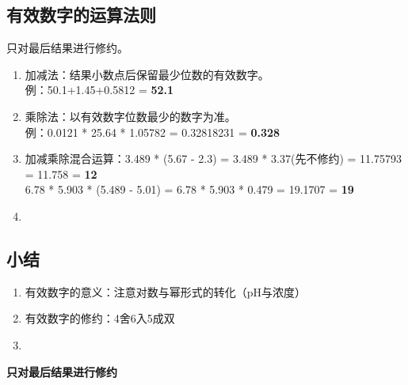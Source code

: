 \documentclass[12pt, a4paper, oneside]{ctexbook}
\begin{document}
\subsection*{有效数字的运算法则}
只对最后结果进行修约。
\begin{enumerate}
    \item 加减法：结果小数点后保留最少位数的有效数字。\\例：50.1+1.45+0.5812 = \textbf{52.1}
    \item 乘除法：以有效数字位数最少的数字为准。\\例：0.0121 * 25.64 * 1.05782 = 0.32818231 = \textbf{0.328}
    \item 加减乘除混合运算：3.489 * (5.67 - 2.3) = 3.489 * 3.37(先不修约) = 11.75793 = 11.758 = \textbf{12}\\6.78 * 5.903 * (5.489 - 5.01) = 6.78 * 5.903 * 0.479 = 19.1707 = \textbf{19}\\
    \item 
\end{enumerate}

\subsection*{小结}
\begin{enumerate}
    \item 有效数字的意义：注意对数与幂形式的转化（pH与浓度）
    \item 有效数字的修约：4舍6入5成双
    \item 
\end{enumerate}

\textbf{只对最后结果进行修约}
\end{document}
